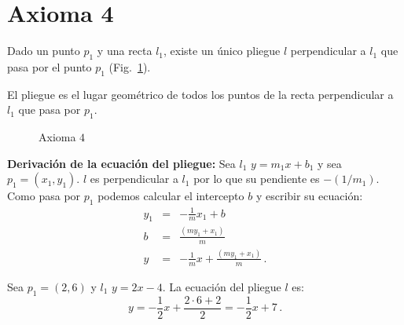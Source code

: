 

\section{Axioma 4}\label{s.ax4}

\begin{axiom}
Dado un punto $p_1$ y una recta $l_1$, existe un único pliegue $l$ perpendicular a $l_1$ que pasa por el punto $p_1$ (Fig.~\ref{f.origami-axiom4}).
\end{axiom}

El pliegue es el lugar geométrico de todos los puntos de la recta perpendicular a $l_1$ que pasa por $p_1$.

\begin{figure}[t]
\begin{center}
\end{center}
\caption{Axioma $4$}\label{f.origami-axiom4}
\end{figure}

\noindent\textbf{Derivación de la ecuación del pliegue:}
Sea $l_1$ $y = m_1x + b_1$ y sea $p_1=(x_1,y_1)$. $l$ es perpendicular a $l_1$ por lo que su pendiente es $-(1/m_1)$. Como pasa por $p_1$ podemos calcular el intercepto $b$ y escribir su ecuación:
\begin{eqnarray*}
y_1&=&-\frac{1}{m} x_1 + b\\
b&=& \frac{(my_1+x_1)}{m}\\
y&=&-\frac{1}{m} x +\frac{(my_1+x_1)}{m}\,.
\end{eqnarray*}
\begin{example}
Sea $p_1=(2,6)$ y $l_1$ $y=2x-4$. La ecuación del pliegue $l$ es:
\[
y=-\frac{1}{2}x + \frac{2\cdot 6 + 2}{2}=-\frac{1}{2}x + 7\,.
\]
\end{example}

